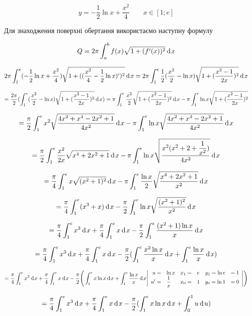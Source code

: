 {}

$$
  y = -\dfrac{1}{2}\ln{x}+\dfrac{x^2}{4} {\qquad} x \in [1;e]
$$

Для знаходження поверхні обертання використаємо наступну формулу

$$Q = 2\pi\int^b_a f(x) \sqrt{1+(f'(x))^2} \hspace{2pt}\text{d}\hspace{1pt}{x} $$

$$
  2\pi \int^e_1 (-\dfrac{1}{2}\ln{x}+\dfrac{x^2}{4}) \sqrt{1+((\dfrac{x^2}{4}-\dfrac{1}{2}\ln{x})')^2} \hspace{2pt}\text{d}\hspace{1pt}{x}
= 2\pi \int^e_1 \dfrac{1}{2} ( \dfrac{x^2}{2} - \ln{x} ) \sqrt{1+(\dfrac{x^2-1}{2x})^2} \hspace{2pt}\text{d}\hspace{1pt}{x}
$$

$$
= \dfrac{2\pi}{2} ( \int^e_1  ( \dfrac{x^2}{2} - \ln{x} ) \sqrt{1+(\dfrac{x^2-1}{2x})^2} \hspace{2pt}\text{d}\hspace{1pt}{x} )
= \pi \int^e_1  \dfrac{x^2}{2} \sqrt{1+(\dfrac{x^2-1}{2x})^2} \hspace{2pt}\text{d}\hspace{1pt}{x} - \pi \int^e_1 \ln{x} \sqrt{1+(\dfrac{x^2-1}{2x})^2}
$$

$$
= \dfrac{\pi}{2} \int^e_1  x^2 \sqrt{\dfrac{4x^2+x^4-2x^2+1}{4x^2}} \hspace{2pt}\text{d}\hspace{1pt}{x} - \pi \int^e_1 \ln{x} \sqrt{\dfrac{4x^2+x^4-2x^2+1}{4x^2}}\hspace{2pt}\text{d}\hspace{1pt}{x}
$$

$$
= \dfrac{\pi}{2} \int^e_1  \dfrac{x^2}{2x} \sqrt{x^4+2x^2+1} \hspace{2pt}\text{d}\hspace{1pt}{x} - \pi \int^e_1 \ln{x} \sqrt{\dfrac{x^2(x^2+2+\dfrac{1}{x^2})}{4x^2}}\hspace{2pt}\text{d}\hspace{1pt}{x}
$$

$$
= \dfrac{\pi}{4} \int^e_1  x  \sqrt{(x^2+1)^2} \hspace{2pt}\text{d}\hspace{1pt}{x} - \pi  \int^e_1 \dfrac{\ln{x}}{2} \sqrt{\dfrac{x^4+2x^2+1}{x^2}}\hspace{2pt}\text{d}\hspace{1pt}{x}
$$

$$
= \dfrac{\pi}{4} \int^e_1  (x^3+x) \hspace{2pt}\text{d}\hspace{1pt}{x} - \dfrac{\pi}{2}  \int^e_1 \ln{x} \sqrt{\dfrac{(x^2+1)^2}{x^2}}\hspace{2pt}\text{d}\hspace{1pt}{x}
$$

$$
= \dfrac{\pi}{4} \int^e_1 x^3\hspace{2pt}\text{d}\hspace{1pt}{x} + \dfrac{\pi}{4} \int^e_1 x \hspace{2pt}\text{d}\hspace{1pt}{x} - \dfrac{\pi}{2}  \int^e_1  \dfrac{(x^2+1)\ln{x}}{x} \hspace{2pt}\text{d}\hspace{1pt}{x}
$$

$$
= \dfrac{\pi}{4} \int^e_1 x^3\hspace{2pt}\text{d}\hspace{1pt}{x} + \dfrac{\pi}{4} \int^e_1 x \hspace{2pt}\text{d}\hspace{1pt}{x} - \dfrac{\pi}{2}( \int^e_1  \dfrac{x^2 \ln{x}}{x} \hspace{2pt}\text{d}\hspace{1pt}{x} + \int^e_1 \dfrac{\ln{x}}{x} \hspace{2pt}\text{d}\hspace{1pt}{x} )
$$


$$
= \dfrac{\pi}{4} \int^e_1 x^3\hspace{2pt}\text{d}\hspace{1pt}{x} + \dfrac{\pi}{4} \int^e_1 x \hspace{2pt}\text{d}\hspace{1pt}{x} - \dfrac{\pi}{2}\Bigg( \int^e_1  x\ln{x} \hspace{2pt}\text{d}\hspace{1pt}{x} + \int^e_1 \dfrac{\ln{x}}{x} \hspace{2pt}\text{d}\hspace{1pt}{x}
  \Bigg|
    \begin{array}{rlrlrlrl}
      u = & \ln{x} & x_1 = & e & y_1 = \ln{e} & = 1 \\
      u'= & \dfrac{1}{x} & x_0 = & 1 & y_0 = \ln{1} & = 0\\
      \end{array}
  \Bigg|
\Bigg)
$$

$$
= \dfrac{\pi}{4} \int^e_1 x^3\hspace{2pt}\text{d}\hspace{1pt}{x} + \dfrac{\pi}{4} \int^e_1 x \hspace{2pt}\text{d}\hspace{1pt}{x} - \dfrac{\pi}{2}( \int^e_1  x\ln{x} \hspace{2pt}\text{d}\hspace{1pt}{x} + \int^1_0 u \hspace{2pt}\text{d}\hspace{1pt}{u} )
$$

